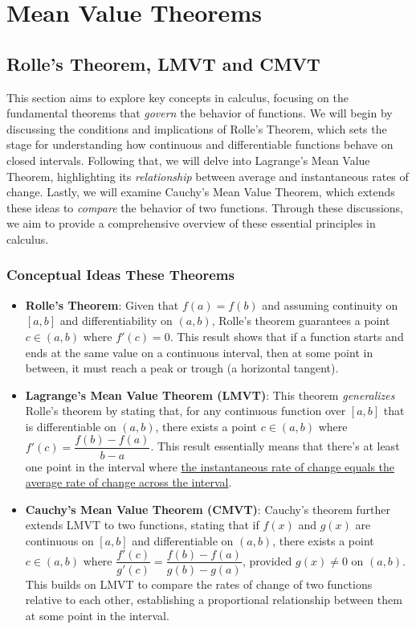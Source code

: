 \documentclass[a4paper,12pt]{book}
\begin{document}
\chapter{Mean Value Theorems}

\section{Rolle's Theorem, LMVT and CMVT}

This section aims to explore key concepts in calculus, focusing on the fundamental theorems that \textit{govern} the behavior of functions. We will begin by discussing the conditions and implications of Rolle's Theorem, which sets the stage for understanding how continuous and differentiable functions behave on closed intervals. Following that, we will delve into Lagrange's Mean Value Theorem, highlighting its \textit{relationship} between average and instantaneous rates of change. Lastly, we will examine Cauchy's Mean Value Theorem, which extends these ideas to \textit{compare} the behavior of two functions. Through these discussions, we aim to provide a comprehensive overview of these essential principles in calculus.
 
\subsection{Conceptual Ideas These Theorems}

\begin{itemize}
	\item 
	\textbf{Rolle’s Theorem}: Given that \( f(a) = f(b) \) and assuming continuity on \([a, b]\) and differentiability on \((a, b)\), Rolle's theorem guarantees a point \( c \in (a, b) \) where \( f'(c) = 0 \). This result shows that if a function starts and ends at the same value on a continuous interval, then at some point in between, it must reach a peak or trough (a horizontal tangent).
	\item 
	\textbf{Lagrange’s Mean Value Theorem (LMVT)}: This theorem \textit{generalizes} Rolle’s theorem by stating that, for any continuous function over \([a, b]\) that is differentiable on \((a, b)\), there exists a point \( c \in (a, b) \) where \( f'(c) = \dfrac{f(b) - f(a)}{b - a} \). This result essentially means that there’s at least one point in the interval where \uline{the instantaneous rate of change equals the average rate of change across the interval}.
	\item
	\textbf{Cauchy’s Mean Value Theorem (CMVT)}: Cauchy’s theorem further extends LMVT to two functions, stating that if \( f(x) \) and \( g(x) \) are continuous on \([a, b]\) and differentiable on \((a, b)\), there exists a point \( c \in (a, b) \) where \(\dfrac{f'(c)}{g'(c)} = \dfrac{f(b) - f(a)}{g(b) - g(a)}\), provided \( g(x) \neq 0 \) on \((a, b)\). This builds on LMVT to compare the rates of change of two functions relative to each other, establishing a proportional relationship between them at some point in the interval.
\end{itemize}
\end{document}
